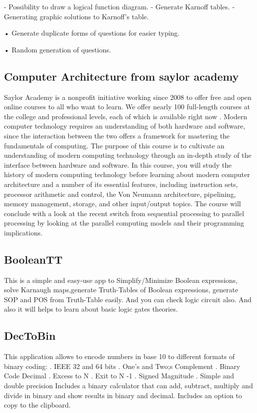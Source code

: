  - Possibility to draw a logical function diagram.
 - Generate Karnoff tables.
 - Generating graphic solutions to Karnoff's table.
 
 • Generate duplicate forms of questions for easier typing.
 
 • Random generation of questions.
 
 \subsection{Computer Architecture from saylor academy}
 Saylor Academy is a nonprofit initiative working since 2008 to offer free and open online courses to all who want to learn.
  We offer nearly 100 full-length courses at the college and professional levels, each of which is available right now .
 Modern computer technology requires an understanding of both hardware and software, since the interaction between the two 
 offers a framework for mastering the fundamentals of computing. The purpose of this course is to cultivate an understanding 
 of modern computing technology through an in-depth study of the interface between hardware and software. In this course,
  you will study the history of modern computing technology before learning about modern computer architecture and a number
   of its essential features, including instruction sets, processor arithmetic and control, the Von Neumann architecture, 
   pipelining, memory management, storage, and other input/output topics. The course will conclude with a look at the recent 
   switch from sequential processing to parallel processing by looking at the parallel computing models and their programming 
   implications.\cite{Computer-Architecture-saylor-academy}
 
 
 
 \subsection{BooleanTT}
 This is a simple and easy-use app to Simplify/Minimize Boolean expressions, solve Karnaugh maps,generate Truth-Tables of Boolean expressions, generate SOP and POS from Truth-Table easily. And you can check logic circuit also.
 And also it will helps to learn about basic logic gates theories.
 
 \subsection{DecToBin}
 This application allows to encode numbers in base 10 to different formats of binary coding:
 . IEEE 32 and 64 bits
 . One's and Two;s Complement
 . Binary Code Decimal
 . Excess to N
 . Exit to N -1
 . Signed Magnitude
 . Simple and double precision
 Includes a binary calculator that can add, subtract, multiply and divide in binary and show results in binary and decimal.
 Includes an option to copy to the clipboard.
 

